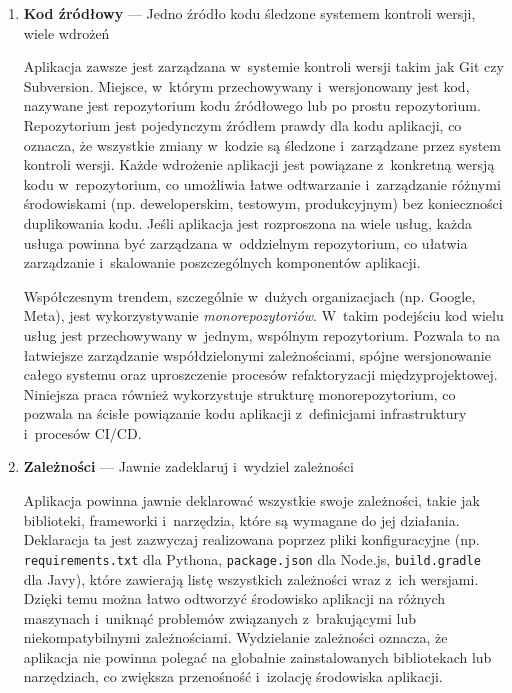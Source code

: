 \begin{enumerate}[label=\Roman*., font=\bfseries]
    \item \textbf{Kod źródłowy} --- Jedno źródło kodu śledzone systemem kontroli wersji, wiele wdrożeń

          Aplikacja zawsze jest zarządzana w~systemie kontroli wersji takim jak Git czy Subversion.
          Miejsce, w~którym przechowywany i~wersjonowany jest kod, nazywane jest repozytorium kodu źródłowego lub po prostu repozytorium.
          Repozytorium jest pojedynczym źródłem prawdy dla kodu aplikacji, co oznacza, że wszystkie zmiany w~kodzie są śledzone i~zarządzane przez system kontroli wersji.
          Każde wdrożenie aplikacji jest powiązane z~konkretną wersją kodu w~repozytorium, co umożliwia łatwe odtwarzanie i~zarządzanie różnymi środowiskami (np. deweloperskim, testowym, produkcyjnym) bez konieczności duplikowania kodu.
          Jeśli aplikacja jest rozproszona na wiele usług, każda usługa powinna być zarządzana w~oddzielnym repozytorium, co ułatwia zarządzanie i~skalowanie poszczególnych komponentów aplikacji.

          Współczesnym trendem, szczególnie w~dużych organizacjach (np. Google, Meta), jest wykorzystywanie \textit{monorepozytoriów}. W~takim podejściu kod wielu usług jest przechowywany w~jednym, wspólnym repozytorium. Pozwala to na łatwiejsze zarządzanie współdzielonymi zależnościami, spójne wersjonowanie całego systemu oraz uproszczenie procesów refaktoryzacji międzyprojektowej. Niniejsza praca również wykorzystuje strukturę monorepozytorium, co pozwala na ścisłe powiązanie kodu aplikacji z~definicjami infrastruktury i~procesów CI/CD.

    \item \textbf{Zależności} --- Jawnie zadeklaruj i~wydziel zależności

          Aplikacja powinna jawnie deklarować wszystkie swoje zależności, takie jak biblioteki, frameworki i~narzędzia, które są wymagane do jej działania.
          Deklaracja ta jest zazwyczaj realizowana poprzez pliki konfiguracyjne (np. \texttt{requirements.txt} dla Pythona, \texttt{package.json} dla Node.js, \texttt{build.gradle} dla Javy),
          które zawierają listę wszystkich zależności wraz z~ich wersjami.
          Dzięki temu można łatwo odtworzyć środowisko aplikacji na różnych maszynach i~uniknąć problemów związanych z~brakującymi lub niekompatybilnymi zależnościami.
          Wydzielanie zależności oznacza, że aplikacja nie powinna polegać na globalnie zainstalowanych bibliotekach lub narzędziach, co zwiększa przenośność i~izolację środowiska aplikacji.


\end{enumerate}
